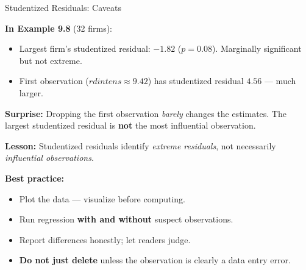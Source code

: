 \documentclass[aspectratio=169, 12pt]{beamer}
\begin{document}
\begin{frame}[shrink=15]{Studentized Residuals: Caveats}

  \textbf{In Example 9.8} (32 firms):
  \begin{itemize}\setlength{\itemsep}{1pt}
    \item Largest firm's studentized residual: $-1.82$ ($p = 0.08$). Marginally significant
    but not extreme.
    \item First observation ($rdintens \approx 9.42$) has studentized residual $4.56$ — much
    larger.
  \end{itemize}

  \begin{highlightbox}
    \textbf{Surprise:} Dropping the first observation \emph{barely} changes the estimates.
    The largest studentized residual is \textbf{not} the most influential observation.

    \medskip
    \textbf{Lesson:} Studentized residuals identify \emph{extreme residuals}, not necessarily
    \emph{influential observations}.
  \end{highlightbox}

  \textbf{Best practice:}
  \begin{itemize}\setlength{\itemsep}{1pt}
    \item Plot the data — visualize before computing.
    \item Run regression \textbf{with and without} suspect observations.
    \item Report differences honestly; let readers judge.
    \item \textbf{Do not just delete} unless the observation is clearly a data entry error.
  \end{itemize}

\end{frame}
\end{document}
